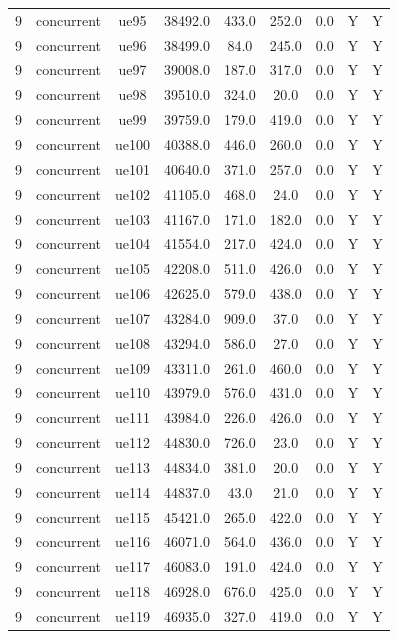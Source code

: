 \begin{table}[ht]
\begin{tabular}{|c|c|c|c|c|c|c|c|c|}
9 & concurrent & ue95 & 38492.0 & 433.0 & 252.0 & 0.0 & Y & Y \\
9 & concurrent & ue96 & 38499.0 & 84.0 & 245.0 & 0.0 & Y & Y \\
9 & concurrent & ue97 & 39008.0 & 187.0 & 317.0 & 0.0 & Y & Y \\
9 & concurrent & ue98 & 39510.0 & 324.0 & 20.0 & 0.0 & Y & Y \\
9 & concurrent & ue99 & 39759.0 & 179.0 & 419.0 & 0.0 & Y & Y \\
9 & concurrent & ue100 & 40388.0 & 446.0 & 260.0 & 0.0 & Y & Y \\
9 & concurrent & ue101 & 40640.0 & 371.0 & 257.0 & 0.0 & Y & Y \\
9 & concurrent & ue102 & 41105.0 & 468.0 & 24.0 & 0.0 & Y & Y \\
9 & concurrent & ue103 & 41167.0 & 171.0 & 182.0 & 0.0 & Y & Y \\
9 & concurrent & ue104 & 41554.0 & 217.0 & 424.0 & 0.0 & Y & Y \\
9 & concurrent & ue105 & 42208.0 & 511.0 & 426.0 & 0.0 & Y & Y \\
9 & concurrent & ue106 & 42625.0 & 579.0 & 438.0 & 0.0 & Y & Y \\
9 & concurrent & ue107 & 43284.0 & 909.0 & 37.0 & 0.0 & Y & Y \\
9 & concurrent & ue108 & 43294.0 & 586.0 & 27.0 & 0.0 & Y & Y \\
9 & concurrent & ue109 & 43311.0 & 261.0 & 460.0 & 0.0 & Y & Y \\
9 & concurrent & ue110 & 43979.0 & 576.0 & 431.0 & 0.0 & Y & Y \\
9 & concurrent & ue111 & 43984.0 & 226.0 & 426.0 & 0.0 & Y & Y \\
9 & concurrent & ue112 & 44830.0 & 726.0 & 23.0 & 0.0 & Y & Y \\
9 & concurrent & ue113 & 44834.0 & 381.0 & 20.0 & 0.0 & Y & Y \\
9 & concurrent & ue114 & 44837.0 & 43.0 & 21.0 & 0.0 & Y & Y \\
9 & concurrent & ue115 & 45421.0 & 265.0 & 422.0 & 0.0 & Y & Y \\
9 & concurrent & ue116 & 46071.0 & 564.0 & 436.0 & 0.0 & Y & Y \\
9 & concurrent & ue117 & 46083.0 & 191.0 & 424.0 & 0.0 & Y & Y \\
9 & concurrent & ue118 & 46928.0 & 676.0 & 425.0 & 0.0 & Y & Y \\
9 & concurrent & ue119 & 46935.0 & 327.0 & 419.0 & 0.0 & Y & Y \\

\end{tabular}
\end{table}
